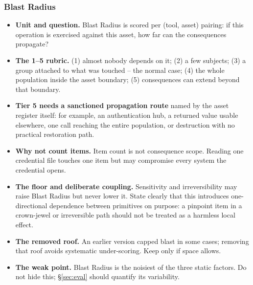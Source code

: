 \subsubsection{Blast Radius}
\label{sec:blast}
\begin{itemize}
  \item \textbf{Unit and question.} Blast Radius is scored per (tool, asset)
        pairing: if this operation is exercised against this asset, how far can
        the consequences propagate?

  \item \textbf{The 1--5 rubric.} (1) almost nobody depends on it; (2) a few
        subjects; (3) a group attached to what was touched -- the normal case;
        (4) the whole population inside the asset boundary; (5) consequences
        can extend beyond that boundary.

  \item \textbf{Tier 5 needs a sanctioned propagation route} named by the asset
        register itself: for example, an authentication hub, a returned value
        usable elsewhere, one call reaching the entire population, or
        destruction with no practical restoration path.

  \item \textbf{Why not count items.} Item count is not consequence scope.
        Reading one credential file touches one item but may compromise every
        system the credential opens.

  \item \textbf{The floor and deliberate coupling.} Sensitivity and
        irreversibility may raise Blast Radius but never lower it. State clearly
        that this introduces one-directional dependence between primitives on
        purpose: a pinpoint item in a crown-jewel or irreversible path should
        not be treated as a harmless local effect.

  \item \textbf{The removed roof.} An earlier version capped blast in some cases;
        removing that roof avoids systematic under-scoring. Keep only if space
        allows.

  \item \textbf{The weak point.} Blast Radius is the noisiest of the three static
        factors. Do not hide this; \S\ref{sec:eval} should quantify its
        variability.
\end{itemize}

